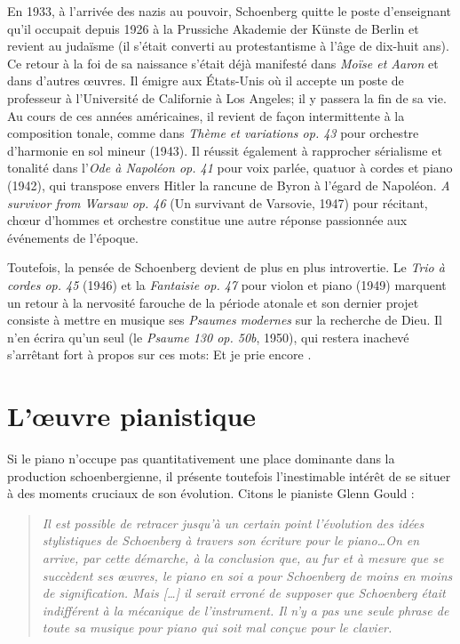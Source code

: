 \documentclass[11pt,a4paper]{scrreprt}
\begin{document}
En 1933, à l'arrivée des nazis au pouvoir, Schoenberg quitte le poste d'enseignant qu'il occupait depuis 1926 à la Prussiche Akademie der Künste de Berlin et revient au judaïsme (il s'était converti au protestantisme à l'âge de dix-huit ans). Ce retour à la foi de sa naissance s'était déjà manifesté dans \emph{Moïse et Aaron} et dans d'autres \oe{}uvres. Il émigre aux États-Unis où il accepte un poste de professeur à l'Université de Californie à Los Angeles; il y passera la fin de sa vie. Au cours de ces années américaines, il revient de façon intermittente à la composition tonale, comme dans \emph{Thème et variations op. 43} pour orchestre d'harmonie en sol mineur (1943). Il réussit également à rapprocher sérialisme et tonalité dans l'\emph{Ode à Napoléon op. 41} pour voix parlée, quatuor à cordes et piano (1942), qui transpose envers Hitler la rancune de Byron à l'égard de Napoléon. \emph{A survivor from Warsaw op. 46} (Un survivant de Varsovie, 1947) pour récitant, ch\oe{}ur d'hommes et orchestre constitue une autre réponse passionnée aux événements de l'époque.

Toutefois, la pensée de Schoenberg devient de plus en plus introvertie. Le \emph{Trio à cordes op. 45} (1946) et la \emph{Fantaisie op. 47} pour violon et piano (1949) marquent un retour à la nervosité farouche de la période atonale et son dernier projet consiste à mettre en musique ses \emph{Psaumes modernes} sur la recherche de Dieu. Il n'en écrira qu'un seul (le \emph{Psaume 130 op. 50b}, 1950), qui restera inachevé s'arrêtant fort à propos sur ces mots: \og{} Et je prie encore \fg{}.


\chapter{L'\oe{}uvre pianistique}
Si le piano n'occupe pas quantitativement une place dominante dans la production schoenbergienne, il présente toutefois l'inestimable intérêt de se situer à des moments cruciaux de son évolution. Citons le pianiste Glenn Gould :
\begin{quote}
\emph{Il est possible de retracer jusqu'à un certain point l'évolution des idées stylistiques de Schoenberg à travers son écriture pour le piano\ldots On en arrive, par cette démarche, à la conclusion que, au fur et à mesure que se succèdent ses \oe{}uvres, le piano \emph{en soi} a pour Schoenberg de moins en moins de signification. Mais [\ldots{}] il serait erroné de supposer que Schoenberg était indifférent à la mécanique de l'instrument. Il n'y a pas une seule phrase de toute sa musique pour piano qui soit mal conçue pour le clavier.}
\end{quote}
\end{document}
